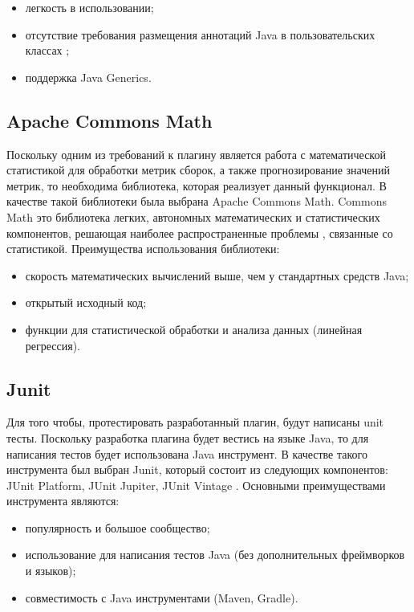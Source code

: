 \begin{itemize}
	\item легкость в использовании;
	\item отсутствие требования размещения аннотаций Java в пользовательских классах \cite{gson};
	\item поддержка Java Generics.
\end{itemize}

\subsection{Apache Commons Math}

Поскольку одним из требований к плагину является работа с математической статистикой для обработки метрик сборок, а также прогнозирование значений метрик, то необходима библиотека, которая реализует данный функционал. В качестве такой библиотеки была выбрана Apache Commons Math. Commons Math это библиотека легких, автономных математических и статистических компонентов, решающая наиболее распространенные проблемы \cite{commath}, связанные со статистикой. Преимущества использования библиотеки:

\begin{itemize}
	\item скорость математических вычислений выше, чем у стандартных средств Java;
	\item открытый исходный код;
	\item функции для статистической обработки и анализа данных (линейная регрессия).
\end{itemize}

\subsection{Junit}

Для того чтобы, протестировать разработанный плагин, будут написаны unit тесты. Поскольку разработка плагина будет вестись на языке Java, то для написания тестов будет использована Java инструмент. В качестве такого инструмента был выбран Junit, который состоит из следующих компонентов:  JUnit Platform, JUnit Jupiter, JUnit Vintage \cite{junit}. Основными преимуществами инструмента являются:

\begin{itemize}
	\item популярность и большое сообщество;
	\item использование для написания тестов Java (без дополнительных фреймворков и языков);
	\item совместимость с Java инструментами (Maven, Gradle).
\end{itemize}

